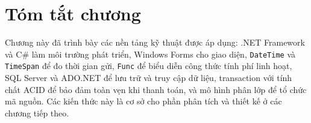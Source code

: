\section{Tóm tắt chương}

Chương này đã trình bày các nền tảng kỹ thuật được áp dụng: .NET Framework và C\# làm môi trường phát triển, Windows Forms cho giao diện, \texttt{DateTime} và \texttt{TimeSpan} để đo thời gian gửi, \texttt{Func} để biểu diễn công thức tính phí linh hoạt, SQL Server và ADO.NET để lưu trữ và truy cập dữ liệu, transaction với tính chất ACID để bảo đảm toàn vẹn khi thanh toán, và mô hình phân lớp để tổ chức mã nguồn. Các kiến thức này là cơ sở cho phần phân tích và thiết kế ở các chương tiếp theo.